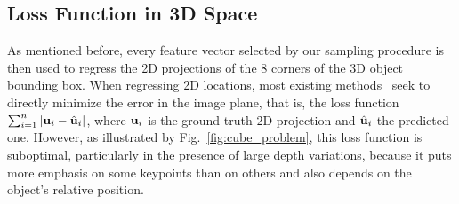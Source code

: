

\subsection{Loss Function in 3D Space}

As mentioned before, every feature vector selected by our sampling procedure is then used to regress the 2D projections of the 8 corners of the 3D object bounding box. %
When regressing 2D locations, most existing methods~\cite{Rad17,Hu19a} seek to directly minimize the error in the image plane, that is, the loss function $\sum_{i=1}^{n}{|{\bf u}_i-\hat{{\bf u}}_i|}$, where ${\bf u}_i$ is the ground-truth 2D projection and $\hat{{\bf u}}_i$ the predicted one. However, as illustrated by Fig.~\ref{fig:cube_problem}, this loss function is suboptimal, particularly in the presence of large depth variations, because it puts more emphasis on some keypoints than on others and also depends on the object's relative position.


